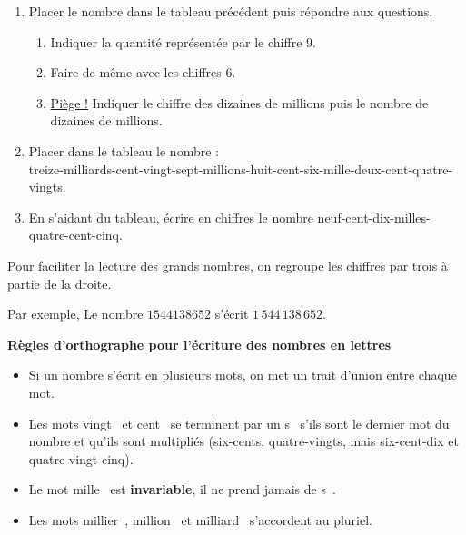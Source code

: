\documentclass[a4paper]{book}
\begin{document}
\newpage


    \begin{exemple}
        \begin{enumerate}
            \item Placer le nombre  dans le tableau précédent puis répondre aux questions.
            \begin{enumerate}
                \item Indiquer la quantité représentée par le chiffre 9.

                \points[38] 
        
                \item Faire de même avec les chiffres 6.

                \points[38] 
                
                \item \underline{Piège !} Indiquer le chiffre des dizaines de millions puis le nombre de dizaines de millions.

                \points[38]
            \end{enumerate}

            \item Placer dans le tableau le nombre : \\
            treize-milliards-cent-vingt-sept-millions-huit-cent-six-mille-deux-cent-quatre-vingts.

            \item En s'aidant du tableau, écrire en chiffres le nombre neuf-cent-dix-milles-quatre-cent-cinq.

            \points[40]
        \end{enumerate}
    \end{exemple}


    \begin{convention}
        Pour faciliter la lecture des grands nombres, on regroupe les chiffres par trois à partie de la droite. 

        \medskip
        
        Par exemple, Le nombre $1544138652$ s'écrit $1 \, 544 \, 138 \, 652$.
    \end{convention}


    \begin{convention}
        \textbf{Règles d'orthographe pour l'écriture des nombres en lettres}
        \begin{itemize}
            \item Si un nombre s'écrit en plusieurs mots, on met un trait d'union entre chaque mot.
            \item Les mots \og vingt \fg\, et \og cent \fg\, se terminent par un \og s \fg\, s'ils sont le dernier mot du nombre et qu'ils sont multipliés (six-cents, quatre-vingts, mais six-cent-dix et quatre-vingt-cinq).
            \item Le mot \og mille \fg\, est \textbf{invariable}, il ne prend jamais de \og s \fg\,.
            \item Les mots \og millier \fg\,, \og million \fg\, et \og milliard \fg\, s'accordent au pluriel.
        \end{itemize}
    \end{convention}
\end{document}
